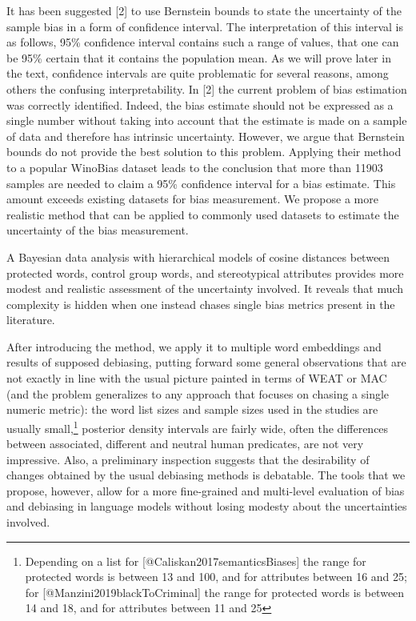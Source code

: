 \documentclass[
  10pt,
  dvipsnames,enabledeprecatedfontcommands]{scrartcl}
\begin{document}
It has been suggested {[}2{]} to use Bernstein bounds to state the
uncertainty of the sample bias in a form of confidence interval. The
interpretation of this interval is as follows, 95\% confidence interval
contains such a range of values, that one can be 95\% certain that it
contains the population mean. As we will prove later in the text,
confidence intervals are quite problematic for several reasons, among
others the confusing interpretability. In {[}2{]} the current problem of
bias estimation was correctly identified. Indeed, the bias estimate
should not be expressed as a single number without taking into account
that the estimate is made on a sample of data and therefore has
intrinsic uncertainty. However, we argue that Bernstein bounds do not
provide the best solution to this problem. Applying their method to a
popular WinoBias dataset leads to the conclusion that more than 11903
samples are needed to claim a 95\% confidence interval for a bias
estimate. This amount exceeds existing datasets for bias measurement. We
propose a more realistic method that can be applied to commonly used
datasets to estimate the uncertainty of the bias measurement.


A Bayesian data analysis with hierarchical models of cosine distances
between protected words, control group words, and stereotypical
attributes provides more modest and realistic assessment of the
uncertainty involved. It reveals that much complexity is hidden when one
instead chases single bias metrics present in the literature.

After introducing the method, we apply it to multiple word embeddings
and results of supposed debiasing, putting forward some general
observations that are not exactly in line with the usual picture painted
in terms of WEAT or MAC (and the problem generalizes to any approach
that focuses on chasing a single numeric metric): the word list sizes
and sample sizes used in the studies are usually
small,\footnote{Depending on a list for [@Caliskan2017semanticsBiases] the range for protected words is between 13 and 100, and for attributes between 16 and 25; for [@Manzini2019blackToCriminal] the range for protected words is between 14 and 18, and for attributes between 11 and 25}
posterior density intervals are fairly wide, often the differences
between associated, different and neutral human predicates, are not very
impressive. Also, a preliminary inspection suggests that the
desirability of changes obtained by the usual debiasing methods is
debatable. The tools that we propose, however, allow for a more
fine-grained and multi-level evaluation of bias and debiasing in
language models without losing modesty about the uncertainties involved.
\end{document}
